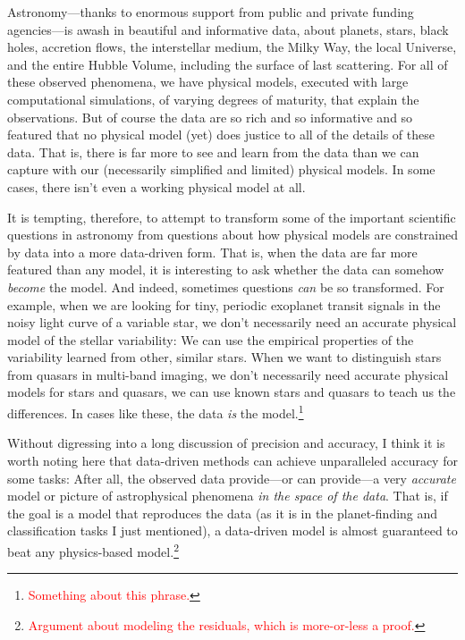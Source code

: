 \documentclass[12pt, twoside, letterpaper]{article}
\newcommand{\todo}[1]{\textcolor{red}{#1}}  %
\begin{document}
Astronomy---thanks to enormous support from public and private funding
agencies---is awash in beautiful and informative data, about planets, stars,
black holes, accretion flows,
the interstellar medium, the Milky Way, the local Universe, and the entire
Hubble Volume, including the surface of last scattering.
For all of these observed phenomena, we have physical models, executed
with large computational simulations, of varying degrees of maturity,
that explain the observations.
But of course the data are so rich and so informative and so featured
that no physical model (yet) does justice to all of the details of these
data.
That is, there is far more to see and learn from the data than we can
capture with our (necessarily simplified and limited) physical models.
In some cases, there isn't even a working physical model at all.

It is tempting, therefore, to attempt to transform some of the important
scientific questions in astronomy from questions about how physical models are
constrained by data into a more data-driven form.
That is, when the data are far more featured than any model, it is interesting
to ask whether the data can somehow \emph{become} the model.
And indeed, sometimes questions \emph{can} be so transformed.
For example, when we are looking for tiny, periodic exoplanet transit
signals in the noisy light curve of a variable star, we don't necessarily
need an accurate physical model of the stellar variability:
We can use the empirical properties of the variability learned from
other, similar stars.
When we want to distinguish stars from quasars in multi-band imaging, we
don't necessarily need accurate physical models for stars and quasars,
we can use known stars and quasars to teach us the differences.
In cases like these, the data \emph{is} the model.\footnote{\todo{Something about this phrase.}}

Without digressing into a long discussion of precision and accuracy, I
think it is worth noting here that data-driven methods can achieve
unparalleled accuracy for some tasks:
After all, the observed data provide---or can provide---a very
\emph{accurate} model or picture of astrophysical phenomena \emph{in
  the space of the data}.
That is, if the goal is a model that reproduces the data (as it is in
the planet-finding and classification tasks I just mentioned), a
data-driven model is almost guaranteed to beat any physics-based
model.\footnote{\todo{Argument about modeling the residuals, which is
    more-or-less a proof.}}
\end{document}
